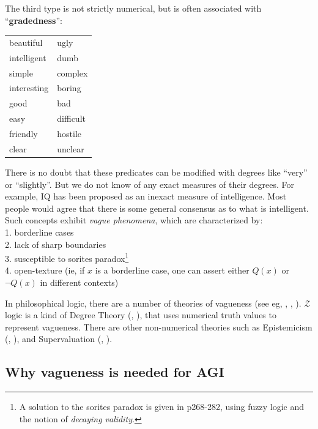 The third type is not strictly numerical, but is often associated with ``\textbf{gradedness}'':\\
\hspace*{0.8cm} \begin{tabular}{l l}
beautiful    & ugly\\
intelligent  & dumb\\
simple       & complex\\
interesting  & boring\\
good         & bad\\
easy         & difficult\\
friendly     & hostile\\
clear        & unclear
\end{tabular}

There is no doubt that these predicates can be modified with degrees like ``very'' or ``slightly''.  But we do not know of any exact measures of their degrees.  For example, IQ has been proposed as an inexact measure of intelligence.  Most people would agree that there is some general consensus as to what is intelligent.  Such concepts exhibit \textit{vague phenomena}, which are characterized by:\\
\hspace*{1cm} 1. borderline cases\\
\hspace*{1cm} 2. lack of sharp boundaries\\
\hspace*{1cm} 3. susceptible to sorites paradox\footnote{A solution to the sorites paradox is given in \citep*{Bergmann2008} p268-282, using fuzzy logic and the notion of \textit{decaying validity}.}\\
\hspace*{1cm} 4. open-texture (ie, if $x$ is a borderline case, one can assert either $Q(x)$ or $\neg Q(x)$ in different contexts)

In philosophical logic, there are a number of theories of vagueness (see eg, \citep*{Graff2002}, \citep*{Keefe2000}, \citep*{Shapiro2006}).  $\mathcal{Z}$ logic is a kind of Degree Theory (\citep*{Edgington1992}, \citep*{Sainsbury1986}), that uses numerical truth values to represent vagueness.  There are other non-numerical theories such as Epistemicism (\citep*{Campbell1974}, \citep*{Williamson1994}), and Supervaluation (\citep*{Fine1975}, \citep*{Keefe2000}).

\subsection{Why vagueness is needed for AGI}
\label{sec:whyZ}

